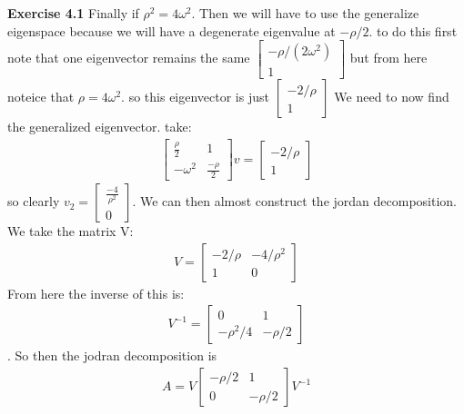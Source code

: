 \documentclass[12pt]{article}
\newenvironment{exercise}[1]{\vspace{.1in}\noindent\textbf{Exercise #1 \hspace{.05em}}}{}
\theoremstyle{definition}
\theoremstyle{remark}
\begin{document}
\begin{exercise}{4.1}
	Finally if $\rho^2=4\omega^2$. Then we will have to use the generalize eigenspace because we will have a degenerate eigenvalue at $-\rho/2$. to do this first note that one eigenvector remains the same $%
		\begin{bmatrix}
			- \rho/(2\omega^2) \\
			1
		\end{bmatrix}$ but from here noteice that $\rho=4\omega^2$. so this eigenvector is just $%
		\begin{bmatrix}
			-2/\rho \\
			1
		\end{bmatrix}$ We need to now find the generalized eigenvector. take:
	\begin{align}
		\begin{bmatrix}
			\frac{\rho}{2} & 1               \\
			-\omega^2      & \frac{-\rho}{2}
		\end{bmatrix}v=%
		\begin{bmatrix}
			-2/\rho \\
			1
		\end{bmatrix}
	\end{align}
	so clearly $v_2=%
		\begin{bmatrix}
			\frac{-4}{\rho^2} \\
			0
		\end{bmatrix}$. We can then almost construct the jordan decomposition. We take the matrix V:
	\begin{align}
		V=%
		\begin{bmatrix}
			-2/\rho & -4/\rho^2 \\
			1       & 0
		\end{bmatrix}
	\end{align}
	From here the inverse of this is:
	\begin{align}
		V^{-1} = %
		\begin{bmatrix}
			0         & 1       \\
			-\rho^2/4 & -\rho/2
		\end{bmatrix}
	\end{align}.
	So then the jodran decomposition is
	\begin{align}
		A=V %
		\begin{bmatrix}
			-\rho/2 & 1       \\
			0       & -\rho/2
		\end{bmatrix}V^{-1}
	\end{align}

\end{exercise}
\end{document}
